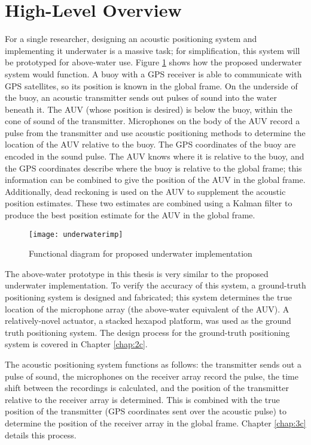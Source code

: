 \documentclass[11pt]{ucthesisCP}
\begin{document}
\section{High-Level Overview} \label{sec:1s3}
For a single researcher, designing an acoustic positioning system and implementing it underwater is a massive task; for simplification, this system will be prototyped for above-water use. Figure \ref{fig:underwaterimp} shows how the proposed underwater system would function. A buoy with a GPS receiver is able to communicate with GPS satellites, so its position is known in the global frame. On the underside of the buoy, an acoustic transmitter sends out pulses of sound into the water beneath it. The AUV (whose position is desired) is below the buoy, within the cone of sound of the transmitter. Microphones on the body of the AUV record a pulse from the transmitter and use acoustic positioning methods to determine the location of the AUV relative to the buoy. The GPS coordinates of the buoy are encoded in the sound pulse. The AUV knows where it is relative to the buoy, and the GPS coordinates describe where the buoy is relative to the global frame; this information can be combined to give the position of the AUV in the global frame. Additionally, dead reckoning is used on the AUV to supplement the acoustic position estimates. These two estimates are combined using a Kalman filter to produce the best position estimate for the AUV in the global frame.

\begin{figure}[htbp]
	\centering
	\texttt{[image: underwaterimp]}
	\caption{Functional diagram for proposed underwater implementation}
	\label{fig:underwaterimp}
\end{figure}

The above-water prototype in this thesis is very similar to the proposed underwater implementation. To verify the accuracy of this system, a ground-truth positioning system is designed and fabricated; this system determines the true location of the microphone array (the above-water equivalent of the AUV). A relatively-novel actuator, a stacked hexapod platform, was used as the ground truth positioning system. The design process for the ground-truth positioning system is covered in Chapter \ref{chap:2c}.

The acoustic positioning system functions as follows: the transmitter sends out a pulse of sound, the microphones on the receiver array record the pulse, the time shift between the recordings is calculated, and the position of the transmitter relative to the receiver array is determined. This is combined with the true position of the transmitter (GPS coordinates sent over the acoustic pulse) to determine the position of the receiver array in the global frame. Chapter \ref{chap:3c} details this process.
\end{document}
